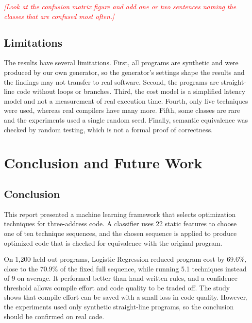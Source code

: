 \documentclass[12pt,a4paper]{article}
\newcommand{\todo}[1]{\textcolor{red}{\textit{[#1]}}}
\begin{document}
\todo{Look at the confusion matrix figure and add one or two sentences naming the classes that are confused most often.}

\subsection{Limitations}

The results have several limitations. First, all programs are synthetic and were produced by our own generator, so the generator's settings shape the results and the findings may not transfer to real software. Second, the programs are straight-line code without loops or branches. Third, the cost model is a simplified latency model and not a measurement of real execution time. Fourth, only five techniques were used, whereas real compilers have many more. Fifth, some classes are rare and the experiments used a single random seed. Finally, semantic equivalence was checked by random testing, which is not a formal proof of correctness.

\newpage

\section{Conclusion and Future Work}

\subsection{Conclusion}

This report presented a machine learning framework that selects optimization techniques for three-address code. A classifier uses 22 static features to choose one of ten technique sequences, and the chosen sequence is applied to produce optimized code that is checked for equivalence with the original program.

On 1{,}200 held-out programs, Logistic Regression reduced program cost by 69.6\%, close to the 70.9\% of the fixed full sequence, while running 5.1 techniques instead of 9 on average. It performed better than hand-written rules, and a confidence threshold allows compile effort and code quality to be traded off. The study shows that compile effort can be saved with a small loss in code quality. However, the experiments used only synthetic straight-line programs, so the conclusion should be confirmed on real code.
\end{document}
